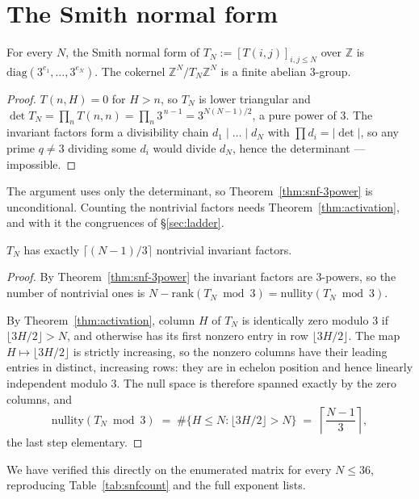 \documentclass[11pt]{article}
\newcommand{\Z}{\mathbb{Z}}
\begin{document}
\section{The Smith normal form}
\label{sec:snf3}

\begin{theorem}
\label{thm:snf-3power}
For every $N$, the Smith normal form of $T_N := [T(i,j)]_{i,j \le N}$ over $\Z$
is $\mathrm{diag}(3^{e_1},\dots,3^{e_N})$. The cokernel $\Z^N/T_N\Z^N$ is a
finite abelian $3$-group.
\end{theorem}

\begin{proof}
$T(n,H) = 0$ for $H > n$, so $T_N$ is lower triangular and
$\det T_N = \prod_n T(n,n) = \prod_n 3^{\,n-1} = 3^{N(N-1)/2}$, a pure power of
$3$. The invariant factors form a divisibility chain $d_1 \mid \dots \mid d_N$
with $\prod d_i = |\det|$, so any prime $q \ne 3$ dividing some $d_i$ would
divide $d_N$, hence the determinant --- impossible.
\end{proof}

The argument uses only the determinant, so Theorem~\ref{thm:snf-3power} is
unconditional. Counting the nontrivial factors needs Theorem~\ref{thm:activation}, and
with it the congruences of \S\ref{sec:ladder}.

\begin{theorem}
\label{thm:snf}
$T_N$ has exactly $\lceil (N-1)/3\rceil$ nontrivial invariant factors.
\end{theorem}

\begin{proof}
By Theorem~\ref{thm:snf-3power} the invariant factors are $3$-powers, so the
number of nontrivial ones is $N - \mathrm{rank}(T_N \bmod 3) =
\mathrm{nullity}(T_N \bmod 3)$.

By Theorem~\ref{thm:activation}, column $H$ of $T_N$ is identically zero
modulo $3$ if $\lfloor 3H/2\rfloor > N$, and otherwise has its first nonzero
entry in row $\lfloor 3H/2\rfloor$. The map $H \mapsto \lfloor 3H/2\rfloor$ is
strictly increasing, so the nonzero columns have their leading entries in
distinct, increasing rows: they are in echelon position and hence linearly
independent modulo $3$. The null space is therefore spanned exactly by the zero
columns, and
\[
  \mathrm{nullity}(T_N \bmod 3)
  \;=\; \#\{H \le N : \lfloor 3H/2\rfloor > N\}
  \;=\; \left\lceil \frac{N-1}{3} \right\rceil ,
\]
the last step elementary.
\end{proof}

We have verified this directly on the enumerated matrix for every $N \le 36$,
reproducing Table~\ref{tab:snfcount} and the full exponent lists.
\end{document}
